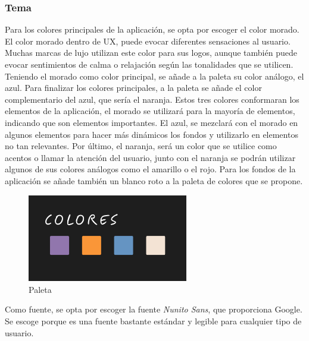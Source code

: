 \documentclass[a4paper, 12pt]{article}
\begin{document}
\subsubsection{Tema}

Para los colores principales de la aplicación, se opta por escoger el color morado. El color morado dentro de UX, puede evocar diferentes sensaciones al usuario. Muchas marcas de lujo utilizan este color para sus logos, aunque también puede evocar sentimientos de calma o relajación según las tonalidades que se utilicen. Teniendo el morado como color principal, se añade a la paleta su color análogo, el azul. Para finalizar los colores principales, a la paleta se añade el color complementario del azul, que sería el naranja. Estos tres colores conformaran los elementos de la aplicación, el morado se utilizará para la mayoría de elementos, indicando que son elementos importantes. El azul, se mezclará con el morado en algunos elementos para hacer más dinámicos los fondos y utilizarlo en elementos no tan relevantes. Por último, el naranja, será un color que se utilice como acentos o llamar la atención del usuario, junto con el naranja se podrán utilizar algunos de sus colores análogos como el amarillo o el rojo. Para los fondos de la aplicación se añade también un blanco roto a la paleta de colores que se propone.

\begin{figure}[H]
	\begin{center}
		{\includegraphics[width=7cm]{Colors.jpg}\par}
		\caption{Paleta}
	\end{center}
\end{figure}

Como fuente, se opta por escoger la fuente \textit{Nunito Sans}, que proporciona Google. Se escoge porque es una fuente bastante estándar y legible para cualquier tipo de usuario.
\end{document}
